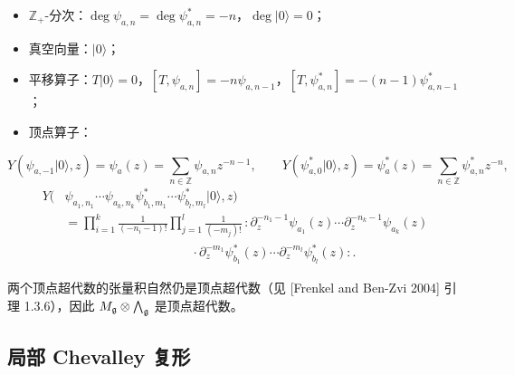 \begin{itemize}
    \item $\mathbb{Z}_+$-分次：$\deg\psi_{a,n} = \deg\psi^*_{a,n} = -n$，$\deg|0\rangle = 0$；
    \item 真空向量：$|0\rangle$；
    \item 平移算子：$T|0\rangle = 0$，$[T,\psi_{a,n}] = -n\psi_{a,n-1}$，$[T,\psi^*_{a,n}] = -(n-1)\psi^*_{a,n-1}$；
    \item 顶点算子：
\end{itemize}
\[
Y(\psi_{a,-1}|0\rangle,z) = \psi_a(z) = \sum_{n\in\mathbb{Z}}\psi_{a,n}z^{-n-1},\qquad
Y(\psi^*_{a,0}|0\rangle,z) = \psi^*_a(z) = \sum_{n\in\mathbb{Z}}\psi^*_{a,n}z^{-n},
\]
\[
\begin{aligned}
Y(&\psi_{a_1,n_1}\cdots\psi_{a_k,n_k}\psi^*_{b_1,m_1}\cdots\psi^*_{b_l,m_l}|0\rangle,z)\\
&= \prod_{i=1}^{k}\frac{1}{(-n_i-1)!}\prod_{j=1}^{l}\frac{1}{(-m_j)!}\,
{:}\partial_z^{-n_1-1}\psi_{a_1}(z)\cdots\partial_z^{-n_k-1}\psi_{a_k}(z)\\
&\qquad\qquad\qquad\qquad\qquad\cdot\partial_z^{-m_1}\psi^*_{b_1}(z)\cdots\partial_z^{-m_l}\psi^*_{b_l}(z){:}.
\end{aligned}
\]


两个顶点超代数的张量积自然仍是顶点超代数（见 [Frenkel and Ben-Zvi 2004] 引理 1.3.6），因此 $M_{\mathfrak{g}}\otimes\bigwedge_{\mathfrak{g}}$ 是顶点超代数。

\subsection{局部 Chevalley 复形}

